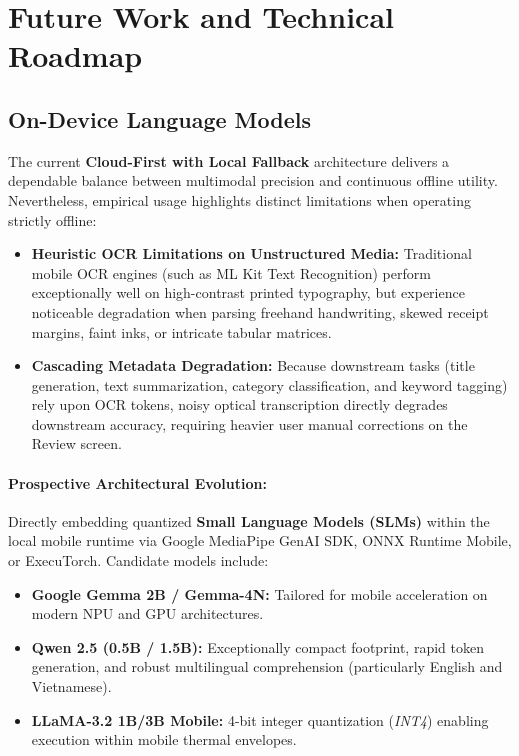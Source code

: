 \section{Future Work and Technical Roadmap}

\subsection{On-Device Language Models}
The current \textbf{Cloud-First with Local Fallback} architecture delivers a dependable balance between multimodal precision and continuous offline utility. Nevertheless, empirical usage highlights distinct limitations when operating strictly offline:
\begin{itemize}
    \item \textbf{Heuristic OCR Limitations on Unstructured Media:} Traditional mobile OCR engines (such as ML Kit Text Recognition) perform exceptionally well on high-contrast printed typography, but experience noticeable degradation when parsing freehand handwriting, skewed receipt margins, faint inks, or intricate tabular matrices.
    \item \textbf{Cascading Metadata Degradation:} Because downstream tasks (title generation, text summarization, category classification, and keyword tagging) rely upon OCR tokens, noisy optical transcription directly degrades downstream accuracy, requiring heavier user manual corrections on the Review screen.
\end{itemize}

\paragraph{Prospective Architectural Evolution:}
Directly embedding quantized \textbf{Small Language Models (SLMs)} within the local mobile runtime via Google MediaPipe GenAI SDK, ONNX Runtime Mobile, or ExecuTorch. Candidate models include:
\begin{itemize}
    \item \textbf{Google Gemma 2B / Gemma-4N:} Tailored for mobile acceleration on modern NPU and GPU architectures.
    \item \textbf{Qwen 2.5 (0.5B / 1.5B):} Exceptionally compact footprint, rapid token generation, and robust multilingual comprehension (particularly English and Vietnamese).
    \item \textbf{LLaMA-3.2 1B/3B Mobile:} 4-bit integer quantization (\textit{INT4}) enabling execution within mobile thermal envelopes.
\end{itemize}

